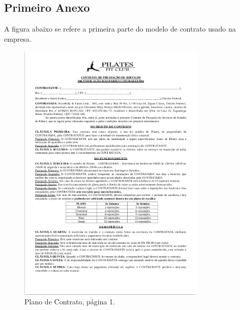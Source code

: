 \begin{anexosenv}
\partanexos
\chapter{Primeiro Anexo}
A figura abaixo se refere a primeira parte do modelo de contrato usado na empresa.
\begin{figure}[h!]
    \centering
    \includegraphics[width=0.8\textwidth]{figuras/contrato_1.png}
    \caption{Plano de Contrato, página 1.}
    \label{fig:contrato_1}
\end{figure}

\end{anexosenv}
